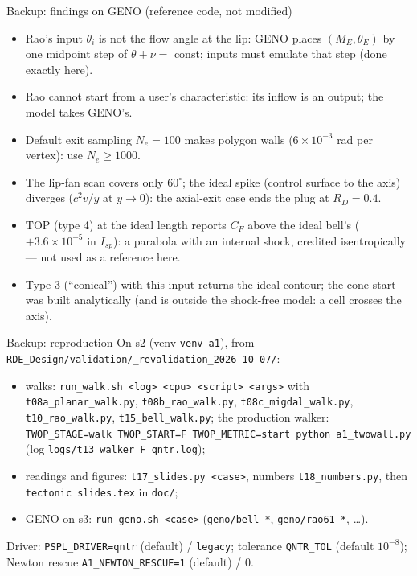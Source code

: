 \documentclass[aspectratio=169,10pt]{beamer}
\begin{document}
\begin{frame}{Backup: findings on GENO (reference code, not modified)}
\footnotesize
\begin{itemize}
\item Rao's input $\theta_i$ is not the flow angle at the lip: GENO places $(M_E,\theta_E)$ by one midpoint step of
$\theta+\nu=$ const; inputs must emulate that step (done exactly here).
\item Rao cannot start from a user's characteristic: its inflow is an output; the model takes GENO's.
\item Default exit sampling $N_e=100$ makes polygon walls ($6\times10^{-3}$ rad per vertex): use $N_e\ge1000$.
\item The lip-fan scan covers only $60^\circ$; the ideal spike (control surface to the axis) diverges ($c^2v/y$ at
$y\to0$): the axial-exit case ends the plug at $R_D=0.4$.
\item TOP (type 4) at the ideal length reports $C_F$ above the ideal bell's ($+3.6\times10^{-5}$ in $I_{sp}$): a
parabola with an internal shock, credited isentropically --- not used as a reference here.
\item Type 3 (``conical'') with this input returns the ideal contour; the cone start was built analytically (and is
outside the shock-free model: a cell crosses the axis).
\end{itemize}
\end{frame}

\begin{frame}{Backup: reproduction}
\footnotesize
On s2 (venv \texttt{venv-a1}), from \texttt{RDE\_Design/validation/\_revalidation\_2026-10-07/}:
\begin{itemize}
\item walks: \texttt{run\_walk.sh <log> <cpu> <script> <args>} with \texttt{t08a\_planar\_walk.py},
\texttt{t08b\_rao\_walk.py}, \texttt{t08c\_migdal\_walk.py}, \texttt{t10\_rao\_walk.py}, \texttt{t15\_bell\_walk.py};
the production walker: \texttt{TWOP\_STAGE=walk TWOP\_START=F TWOP\_METRIC=start python a1\_twowall.py} (log
\texttt{logs/t13\_walker\_F\_qntr.log});
\item readings and figures: \texttt{t17\_slides.py <case>}, numbers \texttt{t18\_numbers.py}, then
\texttt{tectonic slides.tex} in \texttt{doc/};
\item GENO on s3: \texttt{run\_geno.sh <case>} (\texttt{geno/bell\_*}, \texttt{geno/rao61\_*}, \dots).
\end{itemize}
Driver: \texttt{PSPL\_DRIVER=qntr} (default) / \texttt{legacy}; tolerance \texttt{QNTR\_TOL} (default $10^{-8}$);
Newton rescue \texttt{A1\_NEWTON\_RESCUE=1} (default) / 0.
\end{frame}
\end{document}
